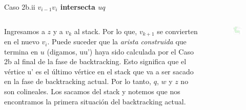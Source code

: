 \documentclass[aspectratio=169,xcolor=dvipsnames, t]{beamer}
\begin{document}

\begin{frame}{Caso 2b.ii}
    \textbf{$v_{i-1}v_{i}$ intersecta $uq$}\\
    \vspace{0.2cm}
    \begin{columns}
    \begin{column}{0.45\textwidth}
    \footnotesize
        Ingresamos a $z$ y a $v_{k}$ al stack. Por lo que, $v_{k+1}$ se convierten en el nuevo $v_{i}$. Puede suceder que la \textit{arista construida} que termina en $u$ (digamos, uu’) haya sido calculada por el Caso 2b al final de la fase de backtracking. Esto significa que el vértice u’ es el último vértice en el stack que va a ser sacado en la fase de backtracking actual. Por lo tanto, $q$, $w$ y $z$ no son colineales. Los sacamos del stack y notemos que nos encontramos la primera situación del backtracking actual.\\
    \vspace{0.5cm}
    \end{column}
    \begin{column}{0.45\textwidth}  %
    \vspace{-2cm}
        \begin{figure}
            \centering
            \includegraphics[width=1\textwidth]{imagenes/Caso2.7b.png}
        \end{figure}
    \end{column}
    \end{columns}
\end{frame}
\end{document}
